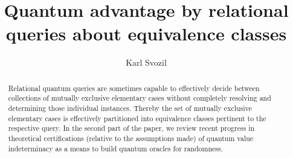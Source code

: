 \documentclass[runningheads]{llncs}
\begin{document}
%
\title{Quantum advantage by relational queries about equivalence classes}
%
%
\author{Karl Svozil}
%
%
%
\maketitle              %
%
\begin{abstract}
Relational quantum queries are sometimes capable to effectively decide between collections of mutually exclusive elementary cases without completely resolving and determining those individual instances. Thereby the set of mutually exclusive elementary cases is effectively partitioned into equivalence classes pertinent to the respective query. In the second part of the paper, we review recent progress in theoretical certifications (relative to the assumptions made) of quantum value indeterminacy as a means to build quantum oracles for randomness.

\end{abstract}
%
%
%
\end{document}
